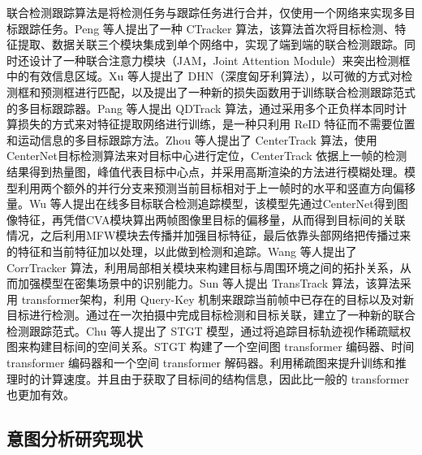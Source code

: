 联合检测跟踪算法是将检测任务与跟踪任务进行合并，仅使用一个网络来实现多目标跟踪任务。Peng 等人\cite{peng2020chained}提出了一种 CTracker 算法，该算法首次将目标检测、特征提取、数据关联三个模块集成到单个网络中，实现了端到端的联合检测跟踪。同时还设计了一种联合注意力模块（JAM，Joint Attention Module）来突出检测框中的有效信息区域。Xu 等人\cite{xu2020deep}提出了 DHN（深度匈牙利算法），以可微的方式对检测框和预测框进行匹配，以及提出了一种新的损失函数用于训练联合检测跟踪范式的多目标跟踪器。Pang 等人\cite{pang2021quasidense}提出 QDTrack 算法，通过采用多个正负样本同时计算损失的方式来对特征提取网络进行训练，是一种只利用 ReID 特征而不需要位置和运动信息的多目标跟踪方法。Zhou 等人\cite{zhou2020tracking}提出了 CenterTrack 算法，使用 CenterNet\cite{zhou2019objects}目标检测算法来对目标中心进行定位，CenterTrack 依据上一帧的检测结果得到热量图，峰值代表目标中心点，并采用高斯渲染的方法进行模糊处理。模型利用两个额外的并行分支来预测当前目标相对于上一帧时的水平和竖直方向偏移量。Wu 等人\cite{wu2021track}提出在线多目标联合检测追踪模型，该模型先通过CenterNet得到图像特征，再凭借CVA模块算出两帧图像里目标的偏移量，从而得到目标间的关联情况，之后利用MFW模块去传播并加强目标特征，最后依靠头部网络把传播过来的特征和当前特征加以处理，以此做到检测和追踪。Wang 等人\cite{wang2021multiple}提出了 CorrTracker 算法，利用局部相关模块来构建目标与周围环境之间的拓扑关系，从而加强模型在密集场景中的识别能力。Sun 等人\cite{sun2020transtrack}提出 TransTrack 算法，该算法采用 transformer\cite{vaswani2017attention}架构，利用 Query-Key 机制来跟踪当前帧中已存在的目标以及对新目标进行检测。通过在一次拍摄中完成目标检测和目标关联，建立了一种新的联合检测跟踪范式。Chu 等人\cite{chu2023transmot}提出了 STGT 模型，通过将追踪目标轨迹视作稀疏赋权图来构建目标间的空间关系。STGT 构建了一个空间图 transformer 编码器、时间 transformer 编码器和一个空间 transformer 解码器。利用稀疏图来提升训练和推理时的计算速度。并且由于获取了目标间的结构信息，因此比一般的 transformer 也更加有效。

\subsection{意图分析研究现状}

